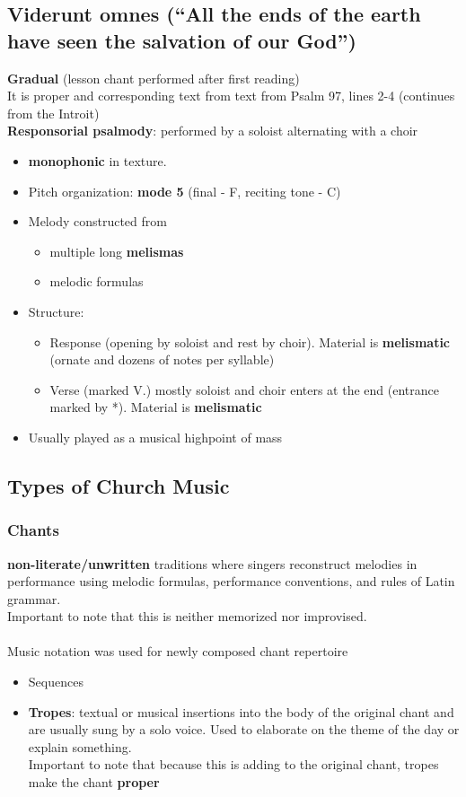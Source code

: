 \documentclass{article}
\begin{document}
  \subsection{Viderunt omnes (“All the ends of the earth have seen the salvation of our God”)}
  \textbf{Gradual} (lesson chant performed after first reading) \\
  It is proper and corresponding text from text from Psalm 97, lines 2-4 (continues from the Introit) \\
  \textbf{Responsorial psalmody}: performed by a soloist alternating with a choir
  \begin{itemize}
    \item \textbf{monophonic} in texture.
    \item Pitch organization: \textbf{mode 5} (final - F, reciting tone - C)
    \item Melody constructed from
      \begin{itemize}
        \item multiple long \textbf{melismas}
        \item melodic formulas
      \end{itemize}
    \item Structure:
    \begin{itemize}
      \item Response (opening by soloist and rest by choir). Material is \textbf{melismatic} (ornate and dozens of notes per syllable)
      \item Verse (marked V.) mostly soloist and choir enters at the end (entrance marked by *). Material is \textbf{melismatic}
    \end{itemize}
    \item Usually played as a musical highpoint of mass
  \end{itemize}
  \subsection{Types of Church Music}
  \subsubsection{Chants}
  \textbf{non-literate/unwritten} traditions where singers reconstruct melodies in performance using melodic formulas, performance conventions, and rules of Latin grammar.\\
  Important to note that this is neither memorized nor improvised. \\ \\
  Music notation was used for newly composed chant repertoire
  \begin{itemize}
    \item Sequences
    \item \textbf{Tropes}: textual or musical insertions into the body of the original chant and are usually sung by a solo voice. Used to elaborate on the theme of the day or explain something. \\
      Important to note that because this is adding to the original chant, tropes make the chant \textbf{proper}
  \end{itemize}
\end{document}

